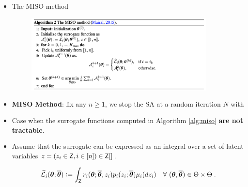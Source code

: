 \documentclass[a0,landscape]{a0poster}
\theoremstyle{definition}
\begin{document}
\begin{multicols}{3}
\begin{tcolorbox}[colback=white!5!white,colframe=blue!75!black,fonttitle=\sffamily\bfseries\large,title=Majorization-Minimization Scheme]
\begin{itemize}
%
%

\item The MISO method~\citep{mairal2015miso}
\begin{figure}[H]
\centering
        \includegraphics[width=0.9\textwidth]{fig/misoalgofull}
\end{figure} 


\item \textbf{MISO Method}: fix any $n \geq 1$, we stop the SA at a random iteration $N$ with
\end{itemize}
\end{tcolorbox}

\begin{tcolorbox}[colback=white!5!white,colframe=blue!75!black,fonttitle=\sffamily\bfseries\large,title=An Inctractability for Latent Data Models]
\begin{itemize}[label=\textbullet, font=\LARGE \color{blue}]
\item Case when the surrogate functions computed in Algorithm \ref{alg:miso} \textbf{are not tractable}.
\item Assume that the surrogate can be expressed as an integral over a set of latent variables $z = (z_i \in \mathsf{Z}, i \in [n]) \in \mathsf{Z}[]$.
\begin{tcolorbox}[colback=red!5!white,colframe=red!75!black]
\begin{equation}\label{eq:integralsurrogate}
\widehat{\cal L}_{i}({\bm{\theta}};\overline{{\bm{\theta}}}) \mathrel{\mathop:}= \int_{\mathsf{Z}}{r_{i}({\bm{\theta}};\overline{{\bm{\theta}}},z_i)  p_i(z_i ; \overline{{\bm{\theta}}})\mu_i(dz_i)}\quad \forall~({\bm{\theta}},\overline{{\bm{\theta}}}) \in \Theta \times \Theta \;.
\end{equation}
\end{tcolorbox}  


\end{itemize}
\end{tcolorbox}
\end{multicols}
\end{document}
